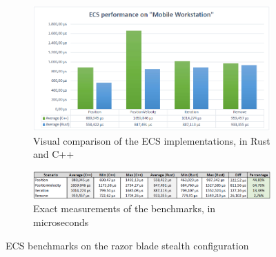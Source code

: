 \clearpage

\begin{figure}[h!]
	\centering
	\begin{subfigure}[b]{\textwidth}
		\includegraphics[width=1\linewidth]{PICs/ecs_bench_workstation.png}
		\caption{Visual comparison of the \ac{ECS} implementations, in Rust and C++}
		\label{fig:Ng1} 
	\end{subfigure}
	
	\begin{subfigure}[b]{\textwidth}
		\includegraphics[width=1\linewidth]{PICs/ecs_bench_workstation_data.png}
		\caption{Exact measurements of the benchmarks, in microseconds}
		\label{fig:Ng2}
	\end{subfigure}
	
	\caption[ECS benchmarks blade]{\ac{ECS} benchmarks on the razor blade stealth configuration}
\end{figure}